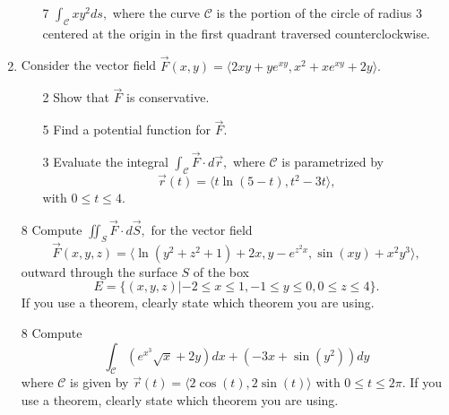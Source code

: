 \documentclass[addpoints,12pt]{exam}
\newcommand{\chooseone}{{\Large$\Circle$\ \ }}
\begin{document}
\begin{enumerate}
\begin{itemize}
\item[7] $\displaystyle\int_{\mathcal{C}}xy^2 ds,$ where the curve $\mathcal{C}$ is the portion
of the circle of radius 3 centered at the origin in the first quadrant traversed counterclockwise.
\vfill
\end{itemize}
\newpage
\item Consider the vector field $\vec{F}(x,y) = \langle 2xy+ye^{xy} , x^2+xe^{xy}+2y
\rangle.$
\begin{itemize}
\item[2] Show that $\vec{F}$ is conservative.
\vfill
\item[5] Find a potential function for $\vec{F}.$
\vfill
\vfill
\vfill
\item[3] Evaluate the integral $\displaystyle\int_{\mathcal{C}} \vec{F} \cdot d\vec{r},$ where
$\mathcal{C}$ is parametrized by $$\vec{r}(t) = \langle t\ln(5-t), t^2-3t \rangle,$$ with $0 \le t \le
4.$
\vfill
\vfill
\end{itemize}
\newpage
\item[8] Compute $\displaystyle\iint_{S} \vec{F} \cdot d{\vec{S}},$ for the vector field
$$\vec{F}(x,y,z) = \langle \ln(y^2+z^2+1) +2x , y - e^{z^2x}, \sin(xy) + x^2y^3 \rangle, $$
outward through the surface $S$ of the box
$$ E = \{(x,y,z) | -2 \le x \le 1, -1\le y \le 0, 0\le z \le 4 \}.$$
If you use a theorem, clearly state which theorem you are using.
\newpage
\item[8] Compute
\[
\int_{\mathcal{C}} \left(e^{x^3}\sqrt{x} + 2y\right)dx+\left(-3x + \sin(y^2) \right)dy
\]
where $\mathcal{C}$ is given by $\vec{r}(t) = \langle 2\cos(t), 2\sin(t)\rangle$ with $0\le t \le
2\pi$. If you use a theorem, clearly state which theorem you are using.
\newpage

\end{enumerate}
\end{document}
